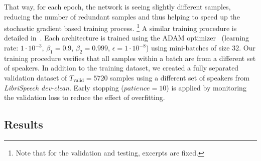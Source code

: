 That way, for each epoch, the network is seeing slightly different samples, reducing the number of redundant samples and thus helping to speed up the stochastic gradient based training process.
\footnote{Note that for the validation and testing, excerpts are fixed.}
A similar training procedure is detailed in~\cite{schluter16, stoeter17}.
Each architecture is trained using the ADAM optimizer~\cite{kingma14} (learning rate: \(1 \cdot 10^{-3}\), \(\beta_1=0.9\), \(\beta_2=0.999\), \(\epsilon=1 \cdot 10^{-8}\)) using mini-batches of size 32.
Our training procedure verifies that all samples within a batch are from a different set of speakers.
In addition to the training dataset, we created a fully separated validation dataset of \(T_{\textrm{valid}} = 5720\) samples using a different set of speakers from \emph{LibriSpeech dev-clean}.
Early stopping (\(patience = 10\)) is applied by monitoring the validation loss to reduce the effect of overfitting.
\subsection{Results}

